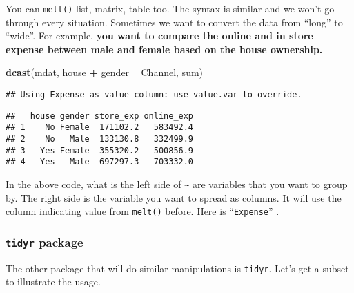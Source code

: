 \documentclass[
]{article}
\newenvironment{Shaded}{\begin{snugshade}}{\end{snugshade}}
\newcommand{\CommentTok}[1]{\textcolor[rgb]{0.56,0.35,0.01}{\textit{#1}}}
\newcommand{\DecValTok}[1]{\textcolor[rgb]{0.00,0.00,0.81}{#1}}
\newcommand{\KeywordTok}[1]{\textcolor[rgb]{0.13,0.29,0.53}{\textbf{#1}}}
\newcommand{\NormalTok}[1]{#1}
\newcommand{\OperatorTok}[1]{\textcolor[rgb]{0.81,0.36,0.00}{\textbf{#1}}}
\newcommand{\StringTok}[1]{\textcolor[rgb]{0.31,0.60,0.02}{#1}}
\begin{document}
You can \texttt{melt()} list, matrix, table too. The syntax is similar
and we won't go through every situation. Sometimes we want to convert
the data from ``long'' to ``wide''. For example, \textbf{you want to
compare the online and in store expense between male and female based on
the house ownership. }

\begin{Shaded}
\begin{Highlighting}[]
\KeywordTok{dcast}\NormalTok{(mdat, house }\OperatorTok{+}\StringTok{ }\NormalTok{gender }\OperatorTok{~}\StringTok{ }\NormalTok{Channel, sum)}
\end{Highlighting}
\end{Shaded}

\begin{verbatim}
## Using Expense as value column: use value.var to override.
\end{verbatim}

\begin{verbatim}
##   house gender store_exp online_exp
## 1    No Female  171102.2   583492.4
## 2    No   Male  133130.8   332499.9
## 3   Yes Female  355320.2   500856.9
## 4   Yes   Male  697297.3   703332.0
\end{verbatim}

In the above code, what is the left side of \texttt{\textasciitilde{}}
are variables that you want to group by. The right side is the variable
you want to spread as columns. It will use the column indicating value
from \texttt{melt()} before. Here is ``\texttt{Expense}'' .

\hypertarget{tidyr-package}{%
\subsubsection{\texorpdfstring{\texttt{tidyr}
package}{tidyr package}}\label{tidyr-package}}

The other package that will do similar manipulations is \texttt{tidyr}.
Let's get a subset to illustrate the usage.

\begin{Shaded}
\end{Shaded}
\end{document}
